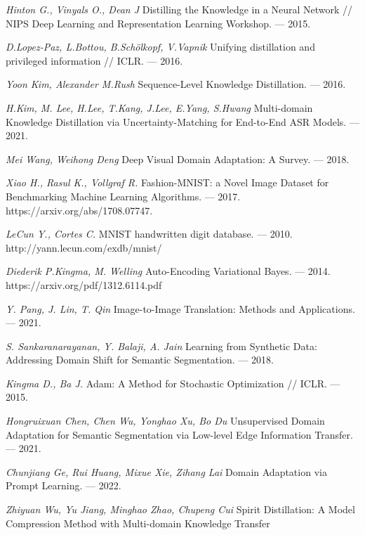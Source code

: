 \newpage


\begin{thebibliography}{99}
	\textit{Hinton G., Vinyals O., Dean J} Distilling the Knowledge in a Neural Network // NIPS Deep Learning and Representation Learning Workshop. — 2015.
    
    \textit{D.Lopez-Paz, L.Bottou, B.Schölkopf, V.Vapnik} Unifying distillation and privileged information // ICLR. — 2016.
	
	\textit{Yoon Kim, Alexander M.Rush} Sequence-Level Knowledge Distillation. — 2016.
	
	\textit{H.Kim, M. Lee, H.Lee, T.Kang, J.Lee, E.Yang, S.Hwang} Multi-domain Knowledge Distillation via Uncertainty-Matching for End-to-End ASR Models. — 2021.
	
	\textit{Mei Wang, Weihong Deng} Deep Visual Domain Adaptation: A Survey. — 2018.
	
    \textit{Xiao H., Rasul K., Vollgraf R.} Fashion-MNIST: a Novel Image Dataset for
    Benchmarking Machine Learning Algorithms. — 2017. https://arxiv.org/abs/1708.07747.
    
    \textit{LeCun Y., Cortes C.} MNIST handwritten digit database. --- 2010. http://yann.lecun.com/exdb/mnist/
    
    \textit{Diederik P.Kingma, M. Welling} Auto-Encoding Variational Bayes. --- 2014. https://arxiv.org/pdf/1312.6114.pdf
    
    \textit{Y. Pang, J. Lin, T. Qin} Image-to-Image Translation: Methods and 
    Applications. --- 2021.
    
    \textit{S. Sankaranarayanan, Y. Balaji, A. Jain} Learning from Synthetic Data: Addressing Domain Shift for Semantic Segmentation. --- 2018.
    
    \textit{Kingma D., Ba J.} Adam: A Method for Stochastic Optimization // ICLR. — 2015.
    
    \textit{Hongruixuan Chen, Chen Wu, Yonghao Xu, Bo Du} Unsupervised Domain Adaptation for Semantic Segmentation via Low-level Edge Information Transfer. --- 2021.
    
    \textit{Chunjiang Ge, Rui Huang, Mixue Xie, Zihang Lai} Domain Adaptation via Prompt Learning. --- 2022.
    
    \textit{Zhiyuan Wu, Yu Jiang,  Minghao Zhao, Chupeng Cui} Spirit Distillation: A Model Compression Method with Multi-domain Knowledge Transfer
    

\end{thebibliography}
